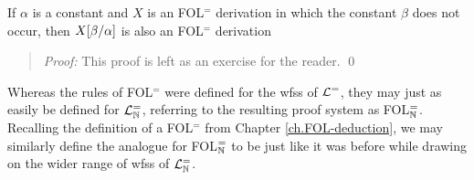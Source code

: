 %

\begin{Lthm} \label{lemma:FOL-prsub}
  If $\alpha$ is a constant and $X$ is an FOL$^=$ derivation in which the constant $\beta$ does not occur, then $X[\beta/\alpha]$ is also an FOL$^=$ derivation 
\end{Lthm}

\begin{quote} 
  \textit{Proof:}
  This proof is left as an exercise for the reader.
  \qed
\end{quote}


Whereas the rules of FOL$^=$ were defined for the wfss of $\mathcal{L}^{=}$, they may just as easily be defined for $\mathcal{L}^{=}_{\mathbb{N}}$, referring to the resulting proof system as FOL$^=_{\mathbb{N}}$. 
Recalling the definition of a FOL$^=$  from Chapter \ref{ch.FOL-deduction}, we may similarly define the analogue for FOL$^=_{\mathbb{N}}$ to be just like it was before while drawing on the wider range of wfss of $\mathcal{L}^{=}_{\mathbb{N}}$.

